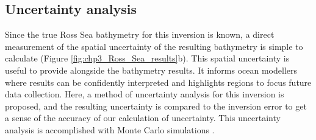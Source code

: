 

\subsection{Uncertainty analysis} \label{chp3:monte_carlo}

Since the true Ross Sea bathymetry for this inversion is known, a direct measurement of the spatial uncertainty of the resulting bathymetry is simple to calculate (Figure \ref{fig:chp3_Ross_Sea_results}b). This spatial uncertainty is useful to provide alongside the bathymetry results. It informs ocean modellers where results can be confidently interpreted and highlights regions to focus future data collection. Here, a method of uncertainty analysis for this inversion is proposed, and the resulting uncertainty is compared to the inversion error to get a sense of the accuracy of our calculation of uncertainty. This uncertainty analysis is accomplished with Monte Carlo simulations \citep{jansenmonte1994, heltonsurvey2006}. \\

